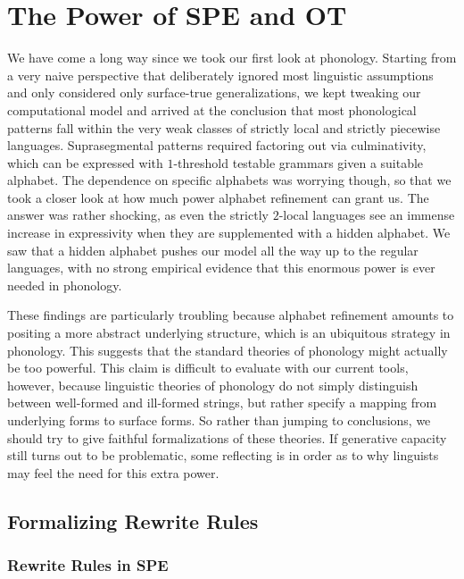 \chapter{The Power of SPE and OT}
\label{cha:SPE}

We have come a long way since we took our first look at phonology.
Starting from a very naive perspective that deliberately ignored most linguistic assumptions and only considered only surface-true generalizations, we kept tweaking our computational model and arrived at the conclusion that most phonological patterns fall within the very weak classes of strictly local and strictly piecewise languages.
Suprasegmental patterns required factoring out via culminativity, which can be expressed with $1$-threshold testable grammars given a suitable alphabet.
The dependence on specific alphabets was worrying though, so that we took a closer look at how much power alphabet refinement can grant us.
The answer was rather shocking, as even the strictly $2$-local languages see an immense increase in expressivity when they are supplemented with a hidden alphabet.
We saw that a hidden alphabet pushes our model all the way up to the regular languages, with no strong empirical evidence that this enormous power is ever needed in phonology.

These findings are particularly troubling because alphabet refinement amounts to positing a more abstract underlying structure, which is an ubiquitous strategy in phonology.
This suggests that the standard theories of phonology might actually be too powerful.
This claim is difficult to evaluate with our current tools, however, because linguistic theories of phonology do not simply distinguish between well-formed and ill-formed strings, but rather specify a mapping from underlying forms to surface forms.
So rather than jumping to conclusions, we should try to give faithful formalizations of these theories.
If generative capacity still turns out to be problematic, some reflecting is in order as to why linguists may feel the need for this extra power.

\section{Formalizing Rewrite Rules}

\subsection{Rewrite Rules in SPE}

